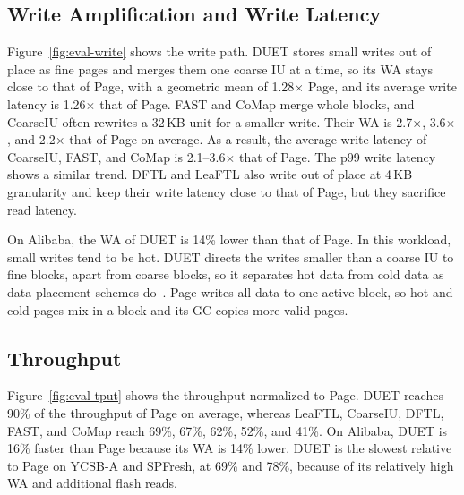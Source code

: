 \subsection{Write Amplification and Write Latency}
Figure~\ref{fig:eval-write} shows the write path. DUET stores small writes out of place as fine pages and merges them one coarse
IU at a time, so its WA stays close to that of Page, with a geometric mean of 1.28$\times$ Page, and its average write latency is 1.26$\times$ that of Page. FAST and CoMap merge whole
blocks, and CoarseIU often rewrites a 32\,KB unit for a smaller write. Their WA is
2.7$\times$, 3.6$\times$, and 2.2$\times$ that of Page on average.
As a result, the average write latency of CoarseIU, FAST, and CoMap is 2.1--3.6$\times$
that of Page. The p99 write
latency shows a similar trend.
DFTL and LeaFTL also write out of
place at 4\,KB granularity and keep their write latency close to that of Page, but
they sacrifice read latency.

On Alibaba, the WA of DUET is 14\% lower than that of Page. In this workload, small writes tend to be hot. DUET directs the
writes smaller than a coarse IU to fine blocks, apart from coarse blocks, so it
separates hot data from cold data as data placement schemes
do~\cite{sepbit,midas,dogi}. Page writes all data to one active block, so hot and
cold pages mix in a block and its GC copies more valid pages.

\subsection{Throughput}
Figure~\ref{fig:eval-tput} shows the throughput normalized to Page. DUET reaches 90\%
of the throughput of Page on average, whereas LeaFTL, CoarseIU, DFTL, FAST, and CoMap
reach 69\%, 67\%, 62\%, 52\%, and 41\%. On Alibaba, DUET is 16\% faster than Page
because its WA is 14\% lower. DUET is the slowest relative to
Page on YCSB-A and SPFresh, at 69\% and 78\%, because of its relatively high WA and additional flash reads.

